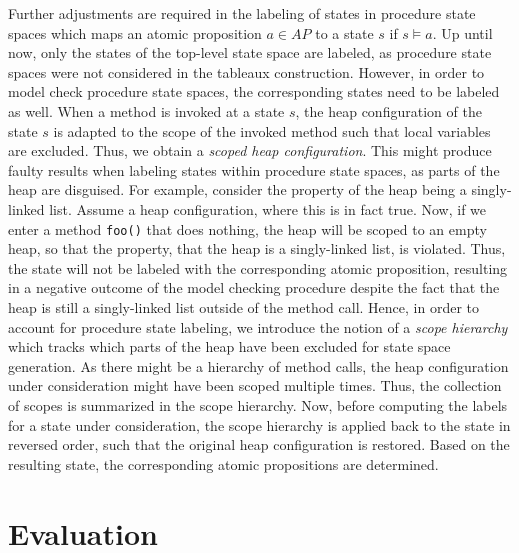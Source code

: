 \documentclass[a4paper, 12pt, twoside]{report}
\begin{document}
	Further adjustments are required in the labeling of states in procedure state spaces which maps an atomic proposition $a \in AP$ to a state $s$ if $s \models a$.  Up until now, only the states of the top-level state space are labeled, as procedure state spaces were not considered in the tableaux construction. However, in order to model check procedure state spaces, the corresponding states need to be labeled as well. When a method is invoked at a state $s$, the heap configuration of the state $s$ is adapted to the scope of the invoked method such that local variables are excluded. Thus, we obtain a \textit{scoped heap configuration}. This might produce faulty results when labeling states within procedure state spaces, as parts of the heap are disguised. For example, consider the property of the heap being a singly-linked list. Assume a heap configuration, where this is in fact true. Now, if we enter a method \texttt{foo()} that does nothing, the heap will be scoped to an empty heap, so that the property, that the heap is a singly-linked list, is violated. Thus, the state will not be labeled with the corresponding atomic proposition, resulting in a negative outcome of the model checking procedure despite the fact that the heap is still a singly-linked list outside of the method call. Hence, in order to account for procedure state labeling, we introduce the notion of a \textit{scope hierarchy} which tracks which parts of the heap have been excluded for state space generation. As there might be a hierarchy of method calls, the heap configuration under consideration might have been scoped multiple times. Thus, the collection of scopes is summarized in the scope hierarchy. Now, before computing the labels for a state under consideration, the scope hierarchy is applied back to the state in reversed order, such that the original heap configuration is restored. Based on the resulting state, the corresponding atomic propositions are determined.
	
	
	\section{Evaluation}
	
\end{document}
